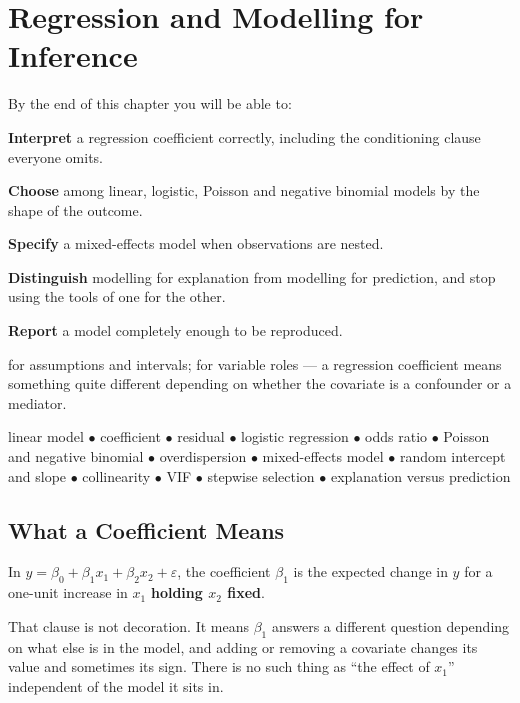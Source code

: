 \chapter{Regression and Modelling for Inference}\label{ch:regression}

\begin{outcomes}
By the end of this chapter you will be able to:
\begin{tight}
  \item \textbf{Interpret} a regression coefficient correctly, including the
    conditioning clause everyone omits.
  \item \textbf{Choose} among linear, logistic, Poisson and negative binomial
    models by the shape of the outcome.
  \item \textbf{Specify} a mixed-effects model when observations are nested.
  \item \textbf{Distinguish} modelling for explanation from modelling for
    prediction, and stop using the tools of one for the other.
  \item \textbf{Report} a model completely enough to be reproduced.
\end{tight}
\end{outcomes}

\begin{prereq}
 for assumptions and intervals;  for
variable roles --- a regression coefficient means something quite different
depending on whether the covariate is a confounder or a mediator.
\end{prereq}

\begin{keyterms}
linear model $\bullet$ coefficient $\bullet$ residual $\bullet$ logistic
regression $\bullet$ odds ratio $\bullet$ Poisson and negative binomial
$\bullet$ overdispersion $\bullet$ mixed-effects model $\bullet$ random
intercept and slope $\bullet$ collinearity $\bullet$ VIF $\bullet$ stepwise
selection $\bullet$ explanation versus prediction
\end{keyterms}

\section{What a Coefficient Means}

\begin{definitionbox}
In $y = \beta_0 + \beta_1 x_1 + \beta_2 x_2 + \varepsilon$, the coefficient
$\beta_1$ is the expected change in $y$ for a one-unit increase in $x_1$
\textbf{holding $x_2$ fixed}.

\medskip
That clause is not decoration. It means $\beta_1$ answers a different question
depending on what else is in the model, and adding or removing a covariate
changes its value and sometimes its sign. There is no such thing as ``the
effect of $x_1$'' independent of the model it sits in.
\end{definitionbox}

